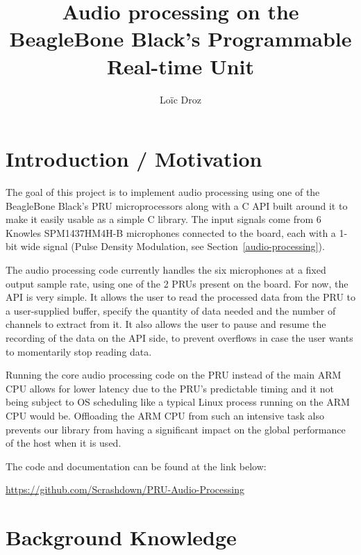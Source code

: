\documentclass[]{report}
\title{Audio processing on the BeagleBone Black's Programmable Real-time Unit}
\author{Loïc Droz}
\begin{document}
\maketitle
\tableofcontents


\hypertarget{introduction-motivation}{%
\chapter{Introduction / Motivation}\label{introduction-motivation}}

The goal of this project is to implement audio processing using one of the BeagleBone Black's PRU microprocessors along with a C API built around it to make it easily usable as a simple C library. The input signals come from 6 Knowles SPM1437HM4H-B microphones connected to the board, each with a 1-bit wide signal (Pulse Density Modulation, see Section~\ref{audio-processing}).

The audio processing code currently handles the six microphones at a fixed output sample rate, using one of the 2 PRUs present on the board. For now, the API is very simple. It allows the user to read the processed data from the PRU to a user-supplied buffer, specify the quantity of data needed and the number of channels to extract from it. It also allows the user to pause and resume the recording of the data on the API side, to prevent overflows in case the user wants to momentarily stop reading data.

Running the core audio processing code on the PRU instead of the main ARM CPU allows for lower latency due to the PRU's predictable timing and it not being subject to OS scheduling like a typical Linux process running on the ARM CPU would be. Offloading the ARM CPU from such an intensive task also prevents our library from having a significant impact on the global performance of the host when it is used.

The code and documentation can be found at the link below:
\begin{center}
	\url{https://github.com/Scrashdown/PRU-Audio-Processing}
\end{center}

	\chapter{Background Knowledge}
	\label{theory}
\end{document}
